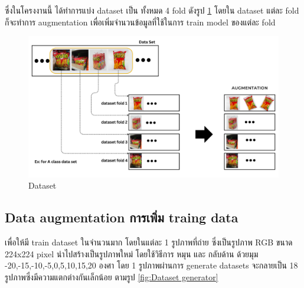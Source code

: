 ซึ่งในโครงงานนี้ ได้ทำการแบ่ง dataset เป็น ทั้งหมด 4 fold ดังรูป \ref{fig:Dataset}
โดยใน dataset แต่ละ fold ก็จะทำการ augmentation เพื่อเพิ่มจำนวนข้อมูลที่ใช้ในการ train model ของแต่ละ fold
\begin{figure}[h]
  \begin{center}

    \includegraphics[scale=0.25]{pic/model/fold_aug.png}
  \end{center}

  \caption[Dataset]{Dataset}
  \label{fig:Dataset}
\end{figure}

\newpage



\subsection{Data augmentation การเพิ่ม traing data}
เพื่อให้มี train dataset ในจำนวนมาก
โดยในแต่ละ 1 รูปภาพที่ถ่าย ซึ่งเป็นรูปภาพ RGB ขนาด 224x224 pixel
นำไปสร้างเป็นรูปภาพใหม่ โดยใช้วิธีการ หมุน และ กลับด้าน ด้วยมุม -20,-15,-10,-5,0,5,10,15,20 องศา
โดย 1 รูปภาพผ่านการ generate datasets จะกลายเป็น 18 รูปภาพซึ่งมีความแตกต่างกันเล็กน้อย ตามรูป \ref{fig:Dataset generator}

